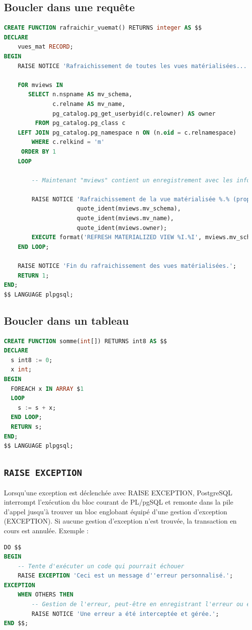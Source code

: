 \subsection{Boucler dans une requête}
\begin{lstlisting}[language=SQL]
CREATE FUNCTION rafraichir_vuemat() RETURNS integer AS $$
DECLARE
    vues_mat RECORD;
BEGIN
    RAISE NOTICE 'Rafraichissement de toutes les vues matérialisées...';

    FOR mviews IN
       SELECT n.nspname AS mv_schema,
              c.relname AS mv_name,
              pg_catalog.pg_get_userbyid(c.relowner) AS owner
         FROM pg_catalog.pg_class c
    LEFT JOIN pg_catalog.pg_namespace n ON (n.oid = c.relnamespace)
        WHERE c.relkind = 'm'
     ORDER BY 1
    LOOP

        -- Maintenant "mviews" contient un enregistrement avec les informations sur la vue matérialisée

        RAISE NOTICE 'Rafraichissement de la vue matérialisée %.% (propriétaire : %)...',
                     quote_ident(mviews.mv_schema),
                     quote_ident(mviews.mv_name),
                     quote_ident(mviews.owner);
        EXECUTE format('REFRESH MATERIALIZED VIEW %I.%I', mviews.mv_schema, mviews.mv_name);
    END LOOP;

    RAISE NOTICE 'Fin du rafraichissement des vues matérialisées.';
    RETURN 1;
END;
$$ LANGUAGE plpgsql;
\end{lstlisting}

\subsection{Boucler dans un tableau}
\begin{lstlisting}[language=SQL]
CREATE FUNCTION somme(int[]) RETURNS int8 AS $$
DECLARE
  s int8 := 0;
  x int;
BEGIN
  FOREACH x IN ARRAY $1
  LOOP
    s := s + x;
  END LOOP;
  RETURN s;
END;
$$ LANGUAGE plpgsql;
\end{lstlisting}

\subsection{\texttt{RAISE EXCEPTION}}
Lorsqu'une exception est déclenchée avec RAISE EXCEPTION, PostgreSQL interrompt l'exécution du bloc courant de PL/pgSQL et remonte dans la pile d'appel jusqu'à trouver un bloc englobant équipé d'une gestion d'exception (EXCEPTION). Si aucune gestion d'exception n'est trouvée, la transaction en cours est annulée. Exemple :
\begin{lstlisting}[language=SQL]
DO $$
BEGIN
    -- Tente d'exécuter un code qui pourrait échouer
    RAISE EXCEPTION 'Ceci est un message d''erreur personnalisé.';
EXCEPTION
    WHEN OTHERS THEN
        -- Gestion de l'erreur, peut-être en enregistrant l'erreur ou en effectuant une autre action corrective.
        RAISE NOTICE 'Une erreur a été interceptée et gérée.';
END $$;
\end{lstlisting}

